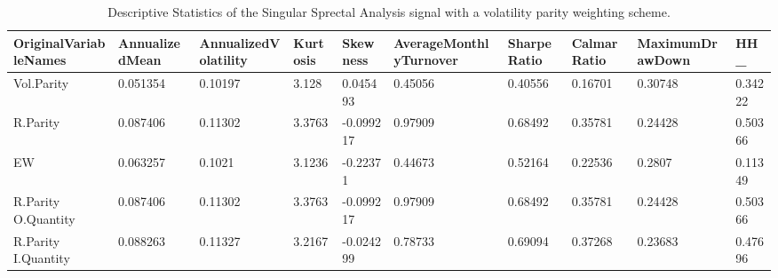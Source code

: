 \begin{table}[H]
\centering
\begin{tabular}{llllllllll}
OriginalVariableNames & AnnualizedMean & AnnualizedVolatility & Kurtosis & Skewness & AverageMonthlyTurnover & SharpeRatio & CalmarRatio & MaximumDrawDown & HH_ \\ 
\hline 
Vol.Parity & 0.051354 & 0.10197 & 3.128 & 0.045493 & 0.45056 & 0.40556 & 0.16701 & 0.30748 & 0.34222 \\ 
R.Parity & 0.087406 & 0.11302 & 3.3763 & -0.099217 & 0.97909 & 0.68492 & 0.35781 & 0.24428 & 0.50366 \\ 
EW & 0.063257 & 0.1021 & 3.1236 & -0.22371 & 0.44673 & 0.52164 & 0.22536 & 0.2807 & 0.11349 \\ 
R.Parity O.Quantity & 0.087406 & 0.11302 & 3.3763 & -0.099217 & 0.97909 & 0.68492 & 0.35781 & 0.24428 & 0.50366 \\ 
R.Parity I.Quantity & 0.088263 & 0.11327 & 3.2167 & -0.024299 & 0.78733 & 0.69094 & 0.37268 & 0.23683 & 0.47696 \\ 
\hline
\end{tabular}
\caption{Descriptive Statistics of the Singular Sprectal Analysis signal with a volatility parity weighting scheme.}
\label{SSA_stats}
\end{table}